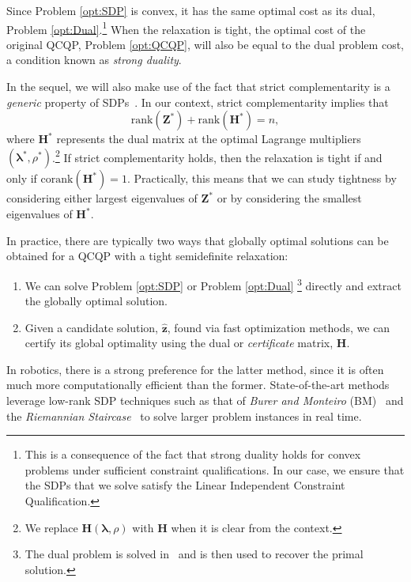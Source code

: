 \documentclass[lettersize,journal]{IEEEtran}
\begin{document}
Since Problem \eqref{opt:SDP} is convex, it has the same optimal cost as its dual, Problem \eqref{opt:Dual}.\footnote{This is a consequence of the fact that strong duality holds for convex problems under sufficient constraint qualifications\cite{boydConvexOptimization2004}. In our case, we ensure that the SDPs that we solve satisfy the Linear Independent Constraint Qualification.} When the relaxation is tight, the optimal cost of the original QCQP, Problem \eqref{opt:QCQP}, will also be equal to the dual problem cost, a condition known as \emph{strong duality}.

In the sequel, we will also make use of the fact that strict complementarity is a \emph{generic} property of SDPs~\cite{alizadehComplementarityNondegeneracySemidefinite1997}. In our context, strict complementarity implies that
\begin{equation}
	 \mbox{rank}(\bm{Z}^*) + \mbox{rank}(\bm{H}^*)=n,
\end{equation}
where $\bm{H}^*$ represents the dual matrix at the optimal Lagrange multipliers $(\bm{\lambda}^*,\rho^*)$.\footnote{We replace $\bm{H}(\bm{\lambda},\rho)$ with $\bm{H}$ when it is clear from the context.} If strict complementarity holds, then the relaxation is tight if and only if $\mbox{corank}(\bm{H}^*)=1$. Practically, this means that we can study tightness by considering either largest eigenvalues of $\bm{Z}^*$ or by considering the smallest eigenvalues of $\bm{H}^*$.

In practice, there are typically two ways that globally optimal solutions can be obtained for a QCQP with a tight semidefinite relaxation:
\begin{enumerate}
	\item We can solve Problem \eqref{opt:SDP} or Problem \eqref{opt:Dual} \footnote{The dual problem is solved in~\cite{brialesCartanSyncFastGlobal2017} and is then used to recover the primal solution.} directly and extract the globally optimal solution.
	\item Given a candidate solution, $ \hat{\bm{z}} $, found via fast optimization methods, we can certify its global optimality using the dual or \emph{certificate} matrix, $\bm{H}$.
\end{enumerate}

In robotics, there is a strong preference for the latter method, since it is often much more computationally efficient than the former. State-of-the-art methods leverage low-rank SDP techniques such as that of \emph{Burer and Monteiro} (BM)~\cite{burerNonlinearProgrammingAlgorithm2003a} and the \emph{Riemannian Staircase}~\cite{rosenSESyncCertifiablyCorrect2019, boumalNonconvexBurerMonteiro2016} to solve larger problem instances in real time.
\end{document}
